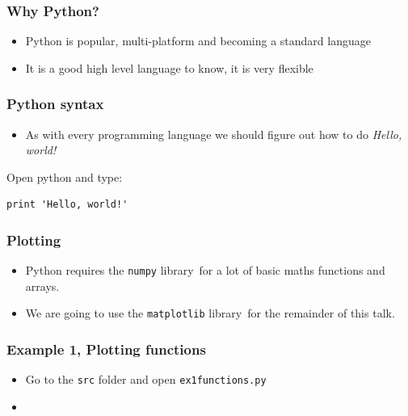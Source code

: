 \documentclass{beamer}
\begin{document}
\begin{frame}
\frametitle{Why Python?} 
\begin{itemize}
	\item Python is popular, multi-platform and becoming a standard language\footnotemark\ 
	\item It is a good high level language to know, it is very flexible
\end{itemize}
\end{frame}

\begin{frame}
\frametitle{Python syntax} 
\begin{itemize}
	\item As with every programming language we should figure out how to do \textit{Hello, world!}
\end{itemize}
Open python and type:
\begin{verbatim}
print 'Hello, world!'
\end{verbatim}
\end{frame}

\begin{frame}
\frametitle{Plotting}
\begin{itemize}
	\item Python requires the \texttt{numpy} library\footnotemark\ for a lot of basic maths functions and arrays.
	\item We are going to use the \texttt{matplotlib} library\footnotemark\ for the remainder of this talk. 
\end{itemize}
\end{frame}

\begin{frame}
\frametitle{Example 1, Plotting functions}
\begin{itemize}
	\item Go to the \texttt{src} folder and open \texttt{ex1functions.py} 
	\item  
\end{itemize}
\end{frame}
\end{document}
